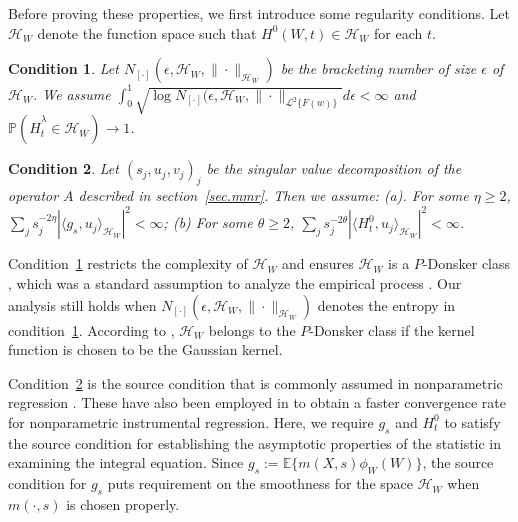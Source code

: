\documentclass[
  12pt]{article}
\newtheorem{assumption}{Condition}
\def\to{\rightarrow}
\def\mE{\mathbb{E}}
\def\cH{\mathcal{H}}
\def\cL{\mathcal{L}}
\def\mE{\mathbb{E}}
\begin{document}

Before proving these properties, we first introduce some regularity conditions. Let $\cH_W$ denote the function space such that $H^0(W,t) \in \cH_W$ for each $t$.  

\begin{assumption}\label{assum.empirical_process}
    Let $N_{[\cdot]}\left(\epsilon,\mathcal{H}_W,\|\cdot\|_{\mathcal{H}_W}\right)$ be the bracketing number of size $\epsilon$ of $\mathcal{H}_W$. We assume $\int_{0}^{1}\sqrt{\log N_{[\cdot]}(\epsilon,\mathcal{H}_W,\|\cdot\|_{\cL^2\{F(w)\}}}d\epsilon<\infty $ and $\mathbb{P}(\widehat{H}_t^\lambda\in\mathcal{H}_W)\to1$.
\end{assumption}


\begin{assumption}\label{assum.source condition} 
Let $(s_{j},u_{j},v_{j})_{j}$ be the singular value decomposition of the operator $A$ described in section~\ref{sec.mmr}. Then we assume: 
(a). For some $\eta\geq 2$, $\sum_j{s_{j}^{-2\eta}|\langle g_s,u_{j}\rangle_{\cH_W} |^2}<\infty $; (b) For some $\theta\geq 2$,
$\sum_j{s_{j}^{-2\theta}|\langle H^0_t,u_{j} \rangle_{\cH_W} |^2}<\infty$.
\end{assumption}

Condition~\ref{assum.empirical_process} restricts the complexity of $\cH_W$ and ensures $\cH_W$ is a $P$-Donsker class \citep{vd1998asymptotic}, which was a standard assumption to analyze the empirical process \citep{beyhum2024testing,lapenta2022encompassing}. Our analysis still holds when $N_{[\cdot]}\left(\epsilon,\mathcal{H}_W,\|\cdot\|_{\mathcal{H}_W}\right)$ denotes the entropy in condition~\ref{assum.empirical_process}. According to \cite{hable2012asymptotic}, $\cH_W$ belongs to the $P$-Donsker class if the kernel function is chosen to be the Gaussian kernel. 

Condition~\ref{assum.source condition} is the source condition that is commonly assumed in nonparametric regression \citep{carrasco2007linear,florens2012instrumental}. These have also been employed in \cite{florens2012instrumental, beyhum2024testing} to obtain a faster convergence rate for nonparametric instrumental regression. Here, we require $g_s$ and $H^0_t$ to satisfy the source condition for establishing the asymptotic properties of the statistic in examining the integral equation. Since $g_s:=\mE\{m(X,s)\phi_W(W)\}$, the source condition for $g_s$ puts requirement on the smoothness for the space $\cH_W$ when $m(\cdot,s)$ is chosen properly. 
\end{document}

